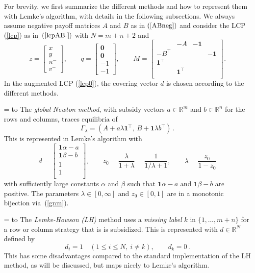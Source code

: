 \documentclass[a4paper,12pt]{article}  %
\def\rmitem#1{\par\hangafter=1\hangindent=\einr
  \noindent\hbox to\einr{\ignorespaces#1\hfill}\ignorespaces}
\newcommand\bullitem{\rmitem{\raise.17ex\hbox{\kern7pt\scriptsize$\bullet$}}}
\theoremstyle{definition}
\def\reals{{\mathbb R}}
\newcommand{\T}{^{\top}}
\newcommand{\0}{{\mathbf0}}
\newcommand{\1}{{\mathbf1}}
\begin{document}
For brevity, we first summarize the different methods and how to
represent them with Lemke's algorithm, with details in the
following subsections.
We always assume negative payoff matrices $A$ and $B$ as in
$(\ref{ABneg})$ and consider the LCP (\ref{lcp}) as
in~$(\ref{lcpAB-})$ with $N=m+n+2$ and
\begin{equation}
\label{tlcp}
z=\left[\begin{matrix}x\\y\\ u^-\\v^-
\end{matrix}\right],\qquad
q=\left[\begin{matrix}\0\\ \0\\  -1\\-1
\end{matrix}\right],\qquad 
M=\left[\begin{matrix}
&-A&-\1\\
-B\T&&&-\1\\
\1\T &\\
&\1\T\\
\end{matrix}\right].
\end{equation}
In the augmented LCP (\ref{lcp0}), the covering vector $d$
is chosen according to the different methods.
\bullitem
The \textit{global Newton method}, with subsidy vectors
$a\in\reals^m$ and $b\in\reals^n$ for the rows and columns,
traces equilibria of 
\begin{equation}
\label{ABl}
\Gamma_\lambda=(A + a\lambda\1\T, ~B+\1\lambda b\T)\,.
\end{equation}
This is represented in Lemke's algorithm with
\begin{equation}
\label{gnm}
d=\left[\begin{matrix} \1\alpha-a\\ \1\beta-b\\1\\1\\
\end{matrix}\right]
,\qquad 
z_0=\frac{\lambda}{1+\lambda}=\frac{1}{1/\lambda+1}
,\qquad 
\lambda = \frac{z_0}{1-z_0}
\end{equation}
with sufficiently large constants $\alpha$ and $\beta$ such
that $\1\alpha-a$ and $\1\beta-b$ are positive.
The parameters $\lambda\in[0,\infty]$ and $z_0\in[0,1]$ are
in a monotonic bijection via~(\ref{gnm}).

\bullitem
The \textit{Lemke-Howson (LH)} method uses a \textit{missing
label} $k$ in $\{1,\ldots,m+n\}$ for a row or column
strategy that is is subsidized. 
This is represented with $d\in\reals^N$ defined by
\begin{equation}
\label{LHd}
d_i=1\quad
(1\le i\le N,~i\ne k),\qquad
d_k=0\,.
\end{equation}
This has some disadvantages compared to the standard
implementation of the LH method, as will be discussed, but
maps nicely to Lemke's algorithm.
\end{document}
